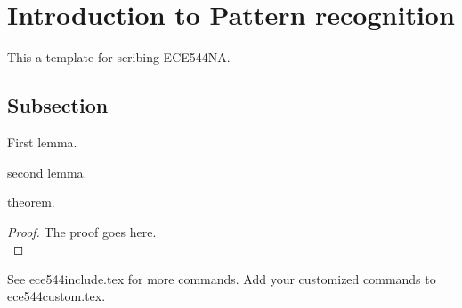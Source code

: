 \section{Introduction to Pattern recognition}

This a template for scribing ECE544NA.

\subsection{Subsection}

\begin{lemma}
	First lemma.
\end{lemma}

\begin{lemma}
	second lemma.
\end{lemma}

\begin{theorem}
	theorem.
\end{theorem}

\begin{proof}
	The proof goes here.\\
\end{proof}

See ece544include.tex for more commands. Add your customized commands to ece544custom.tex.